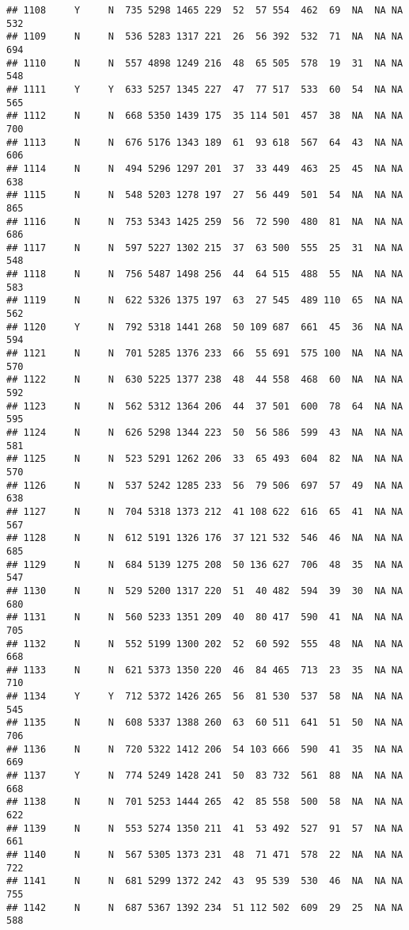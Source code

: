 \documentclass[]{article}
\begin{document}
\begin{verbatim}
## 1108     Y     N  735 5298 1465 229  52  57 554  462  69  NA  NA NA  532
## 1109     N     N  536 5283 1317 221  26  56 392  532  71  NA  NA NA  694
## 1110     N     N  557 4898 1249 216  48  65 505  578  19  31  NA NA  548
## 1111     Y     Y  633 5257 1345 227  47  77 517  533  60  54  NA NA  565
## 1112     N     N  668 5350 1439 175  35 114 501  457  38  NA  NA NA  700
## 1113     N     N  676 5176 1343 189  61  93 618  567  64  43  NA NA  606
## 1114     N     N  494 5296 1297 201  37  33 449  463  25  45  NA NA  638
## 1115     N     N  548 5203 1278 197  27  56 449  501  54  NA  NA NA  865
## 1116     N     N  753 5343 1425 259  56  72 590  480  81  NA  NA NA  686
## 1117     N     N  597 5227 1302 215  37  63 500  555  25  31  NA NA  548
## 1118     N     N  756 5487 1498 256  44  64 515  488  55  NA  NA NA  583
## 1119     N     N  622 5326 1375 197  63  27 545  489 110  65  NA NA  562
## 1120     Y     N  792 5318 1441 268  50 109 687  661  45  36  NA NA  594
## 1121     N     N  701 5285 1376 233  66  55 691  575 100  NA  NA NA  570
## 1122     N     N  630 5225 1377 238  48  44 558  468  60  NA  NA NA  592
## 1123     N     N  562 5312 1364 206  44  37 501  600  78  64  NA NA  595
## 1124     N     N  626 5298 1344 223  50  56 586  599  43  NA  NA NA  581
## 1125     N     N  523 5291 1262 206  33  65 493  604  82  NA  NA NA  570
## 1126     N     N  537 5242 1285 233  56  79 506  697  57  49  NA NA  638
## 1127     N     N  704 5318 1373 212  41 108 622  616  65  41  NA NA  567
## 1128     N     N  612 5191 1326 176  37 121 532  546  46  NA  NA NA  685
## 1129     N     N  684 5139 1275 208  50 136 627  706  48  35  NA NA  547
## 1130     N     N  529 5200 1317 220  51  40 482  594  39  30  NA NA  680
## 1131     N     N  560 5233 1351 209  40  80 417  590  41  NA  NA NA  705
## 1132     N     N  552 5199 1300 202  52  60 592  555  48  NA  NA NA  668
## 1133     N     N  621 5373 1350 220  46  84 465  713  23  35  NA NA  710
## 1134     Y     Y  712 5372 1426 265  56  81 530  537  58  NA  NA NA  545
## 1135     N     N  608 5337 1388 260  63  60 511  641  51  50  NA NA  706
## 1136     N     N  720 5322 1412 206  54 103 666  590  41  35  NA NA  669
## 1137     Y     N  774 5249 1428 241  50  83 732  561  88  NA  NA NA  668
## 1138     N     N  701 5253 1444 265  42  85 558  500  58  NA  NA NA  622
## 1139     N     N  553 5274 1350 211  41  53 492  527  91  57  NA NA  661
## 1140     N     N  567 5305 1373 231  48  71 471  578  22  NA  NA NA  722
## 1141     N     N  681 5299 1372 242  43  95 539  530  46  NA  NA NA  755
## 1142     N     N  687 5367 1392 234  51 112 502  609  29  25  NA NA  588

\end{verbatim}
\end{document}
